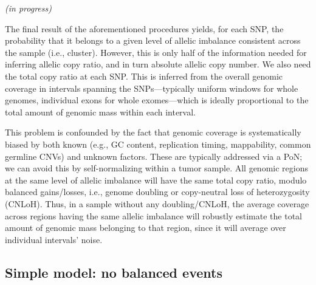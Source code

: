 \documentclass[10pt,letter]{article}
\numberwithin{equation}{section}
\begin{document}
\textit{(in progress)}

The final result of the aforementioned procedures yields, for each SNP, the probability that it belongs to a given level of allelic imbalance consistent across the sample (i.e., cluster). However, this is only half of the information needed for inferring allelic copy ratio, and in turn absolute allelic copy number. We also need the total copy ratio at each SNP. This is inferred from the overall genomic coverage in intervals spanning the SNPs---typically uniform windows for whole genomes, individual exons for whole exomes---which is ideally proportional to the total amount of genomic mass within each interval.

This problem is confounded by the fact that genomic coverage is systematically biased by both known (e.g., GC content, replication timing, mappability, common germline CNVs) and unknown factors. These are typically addressed via a PoN; 
we can avoid this by self-normalizing within a tumor sample. All genomic regions at the same level of allelic imbalance will have the same total copy ratio, modulo balanced gains/losses, i.e., genome doubling or copy-neutral loss of heterozygosity (CNLoH). Thus, in a sample without any doubling/CNLoH, the average coverage across regions having the same allelic imbalance will robustly estimate the total amount of genomic mass belonging to that region, since it will average over individual intervals' noise.

\subsection{Simple model: no balanced events}
\end{document}
